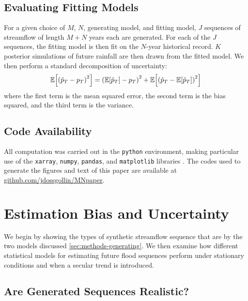 \documentclass[12pt]{article}
\begin{document}
\subsection{Evaluating Fitting Models}

For a given choice of \(M\), \(N\), generating model, and fitting model, \(J\) sequences of streamflow of length \(M+N\) years each are generated.
For each of the \(J\) sequences, the fitting model is then fit on the \(N\)-year historical record.
\(K\) posterior simulations of future rainfall are then drawn from the fitted model.
We then perform a standard decomposition of uncertainty:
\begin{equation}
  \mathbb{E} \qty[ \qty( \hat{p}_T - p_T )^2 ] = \qty( \mathbb{E} \qty[ \hat{p}_T ] - p_T )^2 + \mathbb{E} \qty[ \qty( \hat{p}_T - \mathbb{E} \qty[ \hat{p}_T ] )^2]
\end{equation}
where the first term is the mean squared error, the second term is the bias squared, and the third term is the variance.

\subsection{Code Availability}

All computation was carried out in the \texttt{python} environment, making particular use of the \texttt{xarray}, \texttt{numpy}, \texttt{pandas}, and \texttt{matplotlib} libraries \citep{Hoyer2017,vanderWalt2011,McKinney2010,Hunter2007}.
The codes used to generate the figures and text of this paper are available at \url{github.com/jdossgollin/MNpaper}.


\section{Estimation Bias and Uncertainty}\label{sec:results}

We begin by showing the types of synthetic streamflow sequence that are by the two models discussed \cref{sec:methods-generating}.
We then examine how different statistical models for estimating future flood sequences perform under stationary conditions and when a secular trend is introduced.

\subsection{Are Generated Sequences Realistic?\label{sec:sequence-realistic}}
\end{document}
